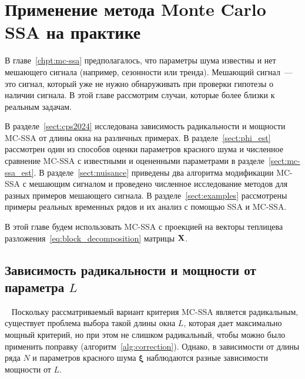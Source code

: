 \documentclass[specialist,
substylefile = spbu_report.rtx,
subf,href,colorlinks=true, 12pt]{disser}
\theoremstyle{definition}
\newcommand{\bfxi}{\boldsymbol{\xi}}
\begin{document}

\chapter{Применение метода Monte Carlo SSA на практике}\label{chpt:mc_ssa_real}
В главе~\ref{chpt:mc-ssa} предполагалось, что параметры шума известны и нет мешающего сигнала (например, сезонности или тренда). Мешающий сигнал~--- это сигнал, который уже не нужно обнаруживать при проверки гипотезы о наличии сигнала.  В этой главе рассмотрим случаи, которые более близки к реальным задачам.

В разделе~\ref{sect:cps2024} исследована зависимость радикальности и мощности MC-SSA от длины окна на различных примерах. В разделе~\ref{sect:phi_est} рассмотрен один из способов оценки параметров красного шума и численное сравнение MC-SSA с известными и оцененными параметрами в разделе~\ref{sect:mc-ssa_est}. В разделе~\ref{sect:nuisance} приведены два алгоритма модификации MC-SSA с мешающим сигналом и проведено численное исследование методов для разных примеров мешающего сигнала. В разделе~\ref{sect:examples} рассмотрены примеры реальных временных рядов и их анализ с помощью SSA и MC-SSA.


В этой главе будем использовать MC-SSA с проекцией на векторы теплицева разложения~\eqref{eq:block_decomposition}
матрицы $\mathbf{X}$.

\section{Зависимость радикальности и мощности от параметра $L$}~\label{sect:cps2024}
Поскольку рассматриваемый вариант критерия MC-SSA является радикальным, существует проблема выбора такой длины окна $L$, которая дает максимально мощный критерий, но при этом не слишком радикальный, чтобы можно было применить поправку (алгоритм~\ref{alg:correction}). Однако, в зависимости от длины ряда $N$ и параметров красного шума $\bfxi$ наблюдаются разные зависимости мощности от $L$.
\end{document}
